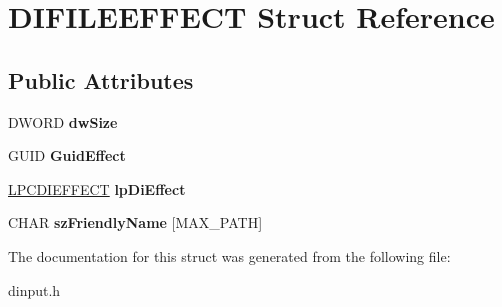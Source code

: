 \hypertarget{struct_d_i_f_i_l_e_e_f_f_e_c_t}{\section{D\-I\-F\-I\-L\-E\-E\-F\-F\-E\-C\-T Struct Reference}
\label{struct_d_i_f_i_l_e_e_f_f_e_c_t}
}
\subsection*{Public Attributes}
\begin{DoxyCompactItemize}
\item 
\hypertarget{struct_d_i_f_i_l_e_e_f_f_e_c_t_a0cc16701015940a703dc62aacc6c606d}{D\-W\-O\-R\-D {\bfseries dw\-Size}}\label{struct_d_i_f_i_l_e_e_f_f_e_c_t_a0cc16701015940a703dc62aacc6c606d}

\item 
\hypertarget{struct_d_i_f_i_l_e_e_f_f_e_c_t_a27be110b77f31fa2632b0f9ff6242f02}{G\-U\-I\-D {\bfseries Guid\-Effect}}\label{struct_d_i_f_i_l_e_e_f_f_e_c_t_a27be110b77f31fa2632b0f9ff6242f02}

\item 
\hypertarget{struct_d_i_f_i_l_e_e_f_f_e_c_t_a1cdb22a69219b214202ca0c50337352a}{\hyperlink{struct_d_i_e_f_f_e_c_t}{L\-P\-C\-D\-I\-E\-F\-F\-E\-C\-T} {\bfseries lp\-Di\-Effect}}\label{struct_d_i_f_i_l_e_e_f_f_e_c_t_a1cdb22a69219b214202ca0c50337352a}

\item 
\hypertarget{struct_d_i_f_i_l_e_e_f_f_e_c_t_a928278ed43edb911776be3a67c2b0faa}{C\-H\-A\-R {\bfseries sz\-Friendly\-Name} \mbox{[}M\-A\-X\-\_\-\-P\-A\-T\-H\mbox{]}}\label{struct_d_i_f_i_l_e_e_f_f_e_c_t_a928278ed43edb911776be3a67c2b0faa}

\end{DoxyCompactItemize}


The documentation for this struct was generated from the following file\-:\begin{DoxyCompactItemize}
\item 
dinput.\-h\end{DoxyCompactItemize}
